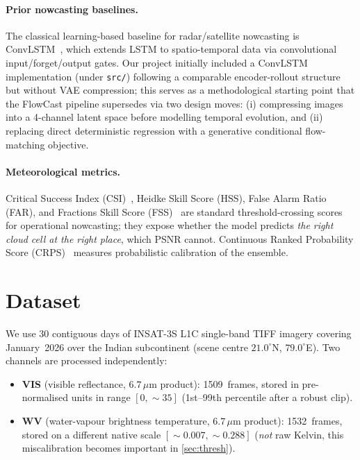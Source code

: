 \documentclass[11pt,a4paper]{article}
\begin{document}
\paragraph{Prior nowcasting baselines.} The classical learning-based baseline
for radar/satellite nowcasting is ConvLSTM~\citep{shi2015convlstm}, which
extends LSTM to spatio-temporal data via convolutional input/forget/output
gates. Our project initially included a ConvLSTM implementation
(under \texttt{src/}) following a comparable encoder-rollout structure but
without VAE compression; this serves as a methodological starting point
that the FlowCast pipeline supersedes via two design moves: (i) compressing
images into a 4-channel latent space before modelling temporal evolution,
and (ii) replacing direct deterministic regression with a generative
conditional flow-matching objective.

\paragraph{Meteorological metrics.} Critical Success Index
(CSI)~\citep{schaefer1990csi}, Heidke Skill Score (HSS), False Alarm Ratio
(FAR), and Fractions Skill Score
(FSS)~\citep{roberts2008fss} are standard threshold-crossing scores for
operational nowcasting; they expose whether the model predicts \emph{the
right cloud cell at the right place}, which {PSNR} cannot. Continuous
Ranked Probability Score (CRPS)~\citep{matheson1976crps} measures
probabilistic calibration of the ensemble.

\section{Dataset}
\label{sec:data}

We use 30 contiguous days of {INSAT-3S} L1C single-band {TIFF} imagery
covering January~2026 over the Indian subcontinent (scene centre
$21.0^{\circ}$N, $79.0^{\circ}$E). Two channels are processed independently:

\begin{itemize}[leftmargin=*]
\item \textbf{VIS} (visible reflectance, $6.7\,\mu$m product): 1509~frames,
      stored in pre-normalised units in range $[0,\sim35]$ (1st--99th
      percentile after a robust clip).
\item \textbf{WV} (water-vapour brightness temperature, $6.7\,\mu$m
      product): 1532~frames, stored on a different native scale
      $[\sim0.007,\sim0.288]$ (\emph{not} raw Kelvin, this miscalibration
      becomes important in \cref{sec:thresh}).
\end{itemize}
\end{document}
